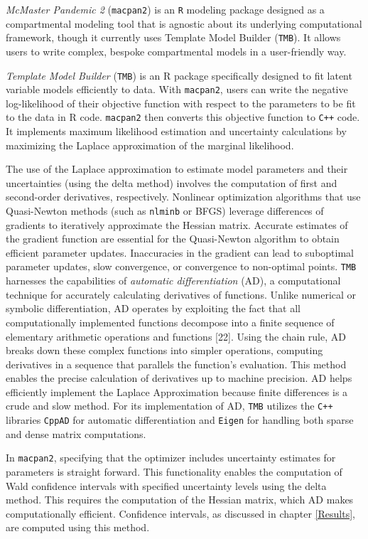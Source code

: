 \documentclass[
11pt, %
oneside, %
english, %
singlespacing, %
]{macthesis} %
\begin{document}
\emph{McMaster Pandemic 2} (\texttt{macpan2}) is an \texttt{R} modeling package designed as a compartmental modeling tool that is agnostic about its underlying computational framework, though it currently uses Template Model Builder (\texttt{TMB}). It allows users to write complex, bespoke compartmental models in a user-friendly way.

\emph{Template Model Builder} (\texttt{TMB}) is an R package specifically designed to fit latent variable models efficiently to data. With \texttt{macpan2}, users can write the negative log-likelihood of their objective function with respect to the parameters to be fit to the data in R code. \texttt{macpan2} then converts this objective function to \texttt{C++} code. It implements maximum likelihood estimation and uncertainty calculations by maximizing the Laplace approximation of the marginal likelihood.

The use of the Laplace approximation to estimate model parameters and their uncertainties (using the delta method) involves the computation of first and second-order derivatives, respectively. Nonlinear optimization algorithms that use Quasi-Newton methods (such as \texttt{nlminb} or BFGS) leverage differences of gradients to iteratively approximate the Hessian matrix. Accurate estimates of the gradient function are essential for the Quasi-Newton algorithm to obtain efficient parameter updates. Inaccuracies in the gradient can lead to suboptimal parameter updates, slow convergence, or convergence to non-optimal points. \texttt{TMB} harnesses the capabilities of \emph{automatic differentiation} (AD), a computational technique for accurately calculating derivatives of functions. Unlike numerical or symbolic differentiation, AD operates by exploiting the fact that all computationally implemented functions decompose into a finite sequence of elementary arithmetic operations and functions {[}22{]}. Using the chain rule, AD breaks down these complex functions into simpler operations, computing derivatives in a sequence that parallels the function's evaluation. This method enables the precise calculation of derivatives up to machine precision. AD helps efficiently implement the Laplace Approximation because finite differences is a crude and slow method. For its implementation of AD, \texttt{TMB} utilizes the \texttt{C++} libraries \texttt{CppAD} for automatic differentiation and \texttt{Eigen} for handling both sparse and dense matrix computations.

In \texttt{macpan2}, specifying that the optimizer includes uncertainty estimates for parameters is straight forward. This functionality enables the computation of Wald confidence intervals with specified uncertainty levels using the delta method. This requires the computation of the Hessian matrix, which AD makes computationally efficient. Confidence intervals, as discussed in chapter \ref{Results}, are computed using this method.
\end{document}
